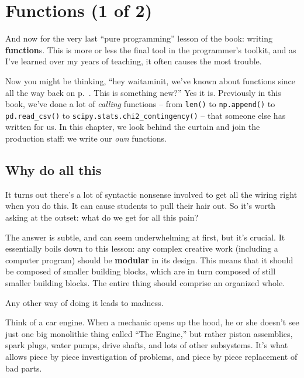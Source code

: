 
\chapter{Functions (1 of 2)}
\label{ch:functions}


And now for the very last ``pure programming'' lesson of the book: writing
\textbf{function}s. This is more or less the final tool in the programmer's
toolkit, and as I've learned over my years of teaching, it often causes the
most trouble.

Now you might be thinking, ``hey waitaminit, we've known about functions since
all the way back on p.~\pageref{function}. This is something new?'' Yes it is.
Previously in this book, we've done a lot of \textit{calling} functions -- from
\texttt{len()} to \texttt{np.append()} to \texttt{pd.read\_csv()} to
\texttt{scipy.stats.chi2\_contingency()} -- that someone else has written for
us. In this chapter, we look behind the curtain and join the production staff:
we write our \textit{own} functions.

\section{Why do all this}

It turns out there's a lot of syntactic nonsense involved to get all the wiring
right when you do this. It can cause students to pull their hair out. So it's
worth asking at the outset: what do we get for all this pain?


The answer is subtle, and can seem underwhelming at first, but it's crucial. It
essentially boils down to this lesson: any complex creative work (including a
computer program) should be \textbf{modular} in its design. This means that it
should be composed of smaller building blocks, which are in turn composed of
still smaller building blocks. The entire thing should comprise an organized
whole.

Any other way of doing it leads to madness.


Think of a car engine. When a mechanic opens up the hood, he or she doesn't see
just one big monolithic thing called ``The Engine,'' but rather piston
assemblies, spark plugs, water pumps, drive shafts, and lots of other
subsystems. It's what allows piece by piece investigation of problems, and
piece by piece replacement of bad parts.

